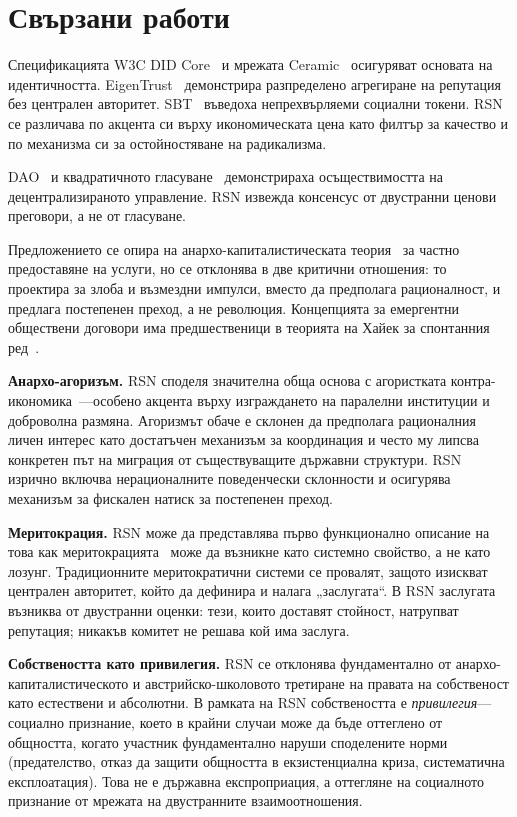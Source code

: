 \documentclass[11pt,a4paper,twocolumn]{article}
\begin{document}
\section{Свързани работи}

Спецификацията W3C DID Core~\cite{did2022} и мрежата Ceramic~\cite{ceramic2023} осигуряват основата на идентичността. EigenTrust~\cite{kamvar2003} демонстрира разпределено агрегиране на репутация без централен авторитет. SBT~\cite{weyl2022} въведоха непрехвърляеми социални токени. RSN се различава по акцента си върху икономическата цена като филтър за качество и по механизма си за остойностяване на радикализма.

DAO~\cite{buterin2014} и квадратичното гласуване~\cite{buterin2019} демонстрираха осъществимостта на децентрализираното управление. RSN извежда консенсус от двустранни ценови преговори, а не от гласуване.

Предложението се опира на анархо-капиталистическата теория~\cite{rothbard1973,hoppe2001} за частно предоставяне на услуги, но се отклонява в две критични отношения: то проектира за злоба и възмездни импулси, вместо да предполага рационалност, и предлага постепенен преход, а не революция. Концепцията за емергентни обществени договори има предшественици в теорията на Хайек за спонтанния ред~\cite{hayek1973}.

\textbf{Анархо-агоризъм.} RSN споделя значителна обща основа с агористката контра-икономика~\cite{konkin2006}---особено акцента върху изграждането на паралелни институции и доброволна размяна. Агоризмът обаче е склонен да предполага рационалния личен интерес като достатъчен механизъм за координация и често му липсва конкретен път на миграция от съществуващите държавни структури. RSN изрично включва нерационалните поведенчески склонности и осигурява механизъм за фискален натиск за постепенен преход.

\textbf{Меритокрация.} RSN може да представлява първо функционално описание на това как меритокрацията~\cite{young1958} може да възникне като системно свойство, а не като лозунг. Традиционните меритократични системи се провалят, защото изискват централен авторитет, който да дефинира и налага „заслугата“. В RSN заслугата възниква от двустранни оценки: тези, които доставят стойност, натрупват репутация; никакъв комитет не решава кой има заслуга.

\textbf{Собствеността като привилегия.} RSN се отклонява фундаментално от анархо-капиталистическото и австрийско-школовото третиране на правата на собственост като естествени и абсолютни. В рамката на RSN собствеността е \emph{привилегия}---социално признание, което в крайни случаи може да бъде оттеглено от общността, когато участник фундаментално наруши споделените норми (предателство, отказ да защити общността в екзистенциална криза, систематична експлоатация). Това не е държавна експроприация, а оттегляне на социалното признание от мрежата на двустранните взаимоотношения.
\end{document}
